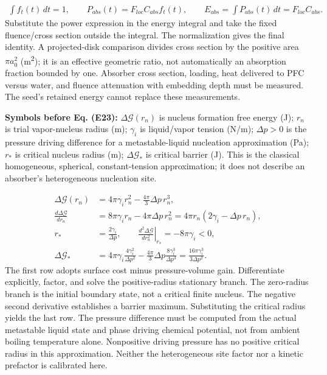 \documentclass[10pt,a4paper]{article}
\begin{document}
{\small\begin{align*}
\int f_t(t)\,dt=1,\qquad
P_{abs}(t)=F_{loc}C_{abs}f_t(t),\qquad
E_{abs}=\int P_{abs}(t)\,dt=F_{loc}C_{abs}. \tag{E22}
\end{align*}}
Substitute the power expression in the energy integral and take the fixed fluence/cross section outside the integral. The normalization gives the final identity. A projected-disk comparison divides cross section by the positive area $\pi a_0^2$ (m\textsuperscript{2}); it is an effective geometric ratio, not automatically an absorption fraction bounded by one. Absorber cross section, loading, heat delivered to PFC versus water, and fluence attenuation with embedding depth must be measured. The seed's retained energy cannot replace these measurements.

\textbf{Symbols before Eq. (E23):} $\Delta\mathcal G(r_n)$ is nucleus formation free energy (J); $r_n$ is trial vapor-nucleus radius (m); $\gamma_i$ is liquid/vapor tension (N/m); $\Delta p>0$ is the pressure driving difference for a metastable-liquid nucleation approximation (Pa); $r_*$ is critical nucleus radius (m); $\Delta\mathcal G_*$ is critical barrier (J). This is the classical homogeneous, spherical, constant-tension approximation; it does not describe an absorber's heterogeneous nucleation site.

{\small\begin{align*}
\Delta\mathcal G(r_n)&=4\pi\gamma_i r_n^2-\frac{4\pi}{3}\Delta p\,r_n^3,\\
\frac{d\Delta\mathcal G}{dr_n}&=8\pi\gamma_i r_n-4\pi\Delta p\,r_n^2
=4\pi r_n(2\gamma_i-\Delta p\,r_n),\\
r_*&=\frac{2\gamma_i}{\Delta p},\qquad
\left.\frac{d^2\Delta\mathcal G}{dr_n^2}\right|_{r_*}=-8\pi\gamma_i<0,\\
\Delta\mathcal G_*&=4\pi\gamma_i\frac{4\gamma_i^2}{\Delta p^2}
-\frac{4\pi}{3}\Delta p\frac{8\gamma_i^3}{\Delta p^3}
=\frac{16\pi\gamma_i^3}{3\Delta p^2}. \tag{E23}
\end{align*}}
The first row adopts surface cost minus pressure-volume gain. Differentiate explicitly, factor, and solve the positive-radius stationary branch. The zero-radius branch is the initial boundary state, not a critical finite nucleus. The negative second derivative establishes a barrier maximum. Substituting the critical radius yields the last row. The pressure difference must be computed from the actual metastable liquid state and phase driving chemical potential, not from ambient boiling temperature alone. Nonpositive driving pressure has no positive critical radius in this approximation. Neither the heterogeneous site factor nor a kinetic prefactor is calibrated here.
\end{document}
